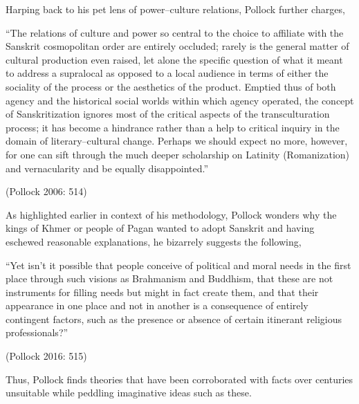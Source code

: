 Harping back to his pet lens of power–culture relations, Pollock further charges,

\begin{myquote}
“The relations of culture and power so central to the choice to affiliate with the Sanskrit cosmopolitan order are entirely occluded; rarely is the general matter of cultural production even raised, let alone the specific question of what it meant to address a supralocal as opposed to a local audience in terms of either the sociality of the process or the aesthetics of the product. Emptied thus of both agency and the historical social worlds within which agency operated, the concept of Sanskritization ignores most of the critical aspects of the transculturation process; it has become a hindrance rather than a help to critical inquiry in the domain of literary–cultural change. Perhaps we should expect no more, however, for one can sift through the much deeper scholarship on Latinity (Romanization) and vernacularity and be equally disappointed.”
\end{myquote}

\hfill (Pollock 2006: 514)

As highlighted earlier in context of his methodology, Pollock wonders why the kings of Khmer or people of Pagan wanted to adopt Sanskrit and having eschewed reasonable explanations, he bizarrely suggests the following,

\begin{myquote}
“Yet isn’t it possible that people conceive of political and moral needs in the first place through such visions as Brahmanism and Buddhism, that these are not instruments for filling needs but might in fact create them, and that their appearance in one place and not in another is a consequence of entirely contingent factors, such as the presence or absence of certain itinerant religious professionals?”
\end{myquote}

\hfill (Pollock 2016: 515)

Thus, Pollock finds theories that have been corroborated with facts over centuries unsuitable while peddling imaginative ideas such as these.

